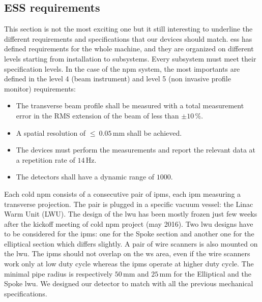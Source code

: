 \begin{refsection}
  \section{ESS requirements}
  This section is not the most exciting one but it still interesting to underline the different requirements and specifications that our devices should match. \acrshort{ess} has defined requirements for the whole machine, and they are organized on different levels starting from installation to subsystems. Every subsystem must meet their specification levels. In the case of the \acrshort{npm} system, the most importants are defined in the level 4 (beam instrument) and level 5 (non invasive profile monitor) requirements:
  \begin{itemize}
    \item The transverse beam profile shall be measured with a total measurement error in the RMS extension of the beam of less than $\pm10\,\%$.
    \item A spatial resolution of \(\leq\ 0.05\,\mathrm{mm}\) shall be achieved.
    \item The devices must perform the measurements and report the relevant data at a repetition rate of \(14\,\mathrm{Hz}\).
    \item The detectors shall have a dynamic range of $1000$.
  \end{itemize}

  Each cold \acrshort{npm} consists of a consecutive pair of \acrshort{ipm}s, each \acrshort{ipm} measuring a transverse projection. The pair is plugged in a specific vacuum vessel: the Linac Warm Unit (LWU). The design of the \acrshort{lwu} has been mostly frozen just few weeks after the kickoff meeting of cold \acrshort{npm} project (may 2016). Two \acrshort{lwu} designs have to be considered for the \acrshort{ipm}s: one for the Spoke section and another one for the elliptical section which differs slightly. A pair of wire scanners is also mounted on the \acrshort{lwu}. The \acrshort{ipm}s should not overlap on the \acrshort{ws} area, even if the wire scanners work only at low duty cycle whereas the \acrshort{ipm}s operate at higher duty cycle. The minimal pipe radius is respectively \(50\,\mathrm{mm}\) and \(25\,\mathrm{mm}\) for the Elliptical and the Spoke \acrshort{lwu}. We designed our detector to match with all the previous mechanical specifications.

  


\end{refsection}
